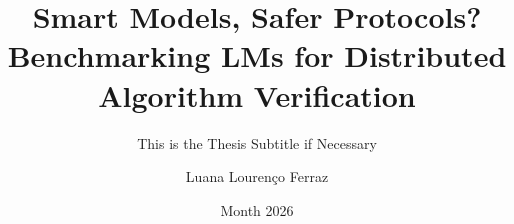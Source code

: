 %
%
\title{Smart Models, Safer Protocols? Benchmarking LMs for Distributed Algorithm Verification}
\subtitle{This is the Thesis Subtitle if Necessary}
%
\author{Luana Lourenço Ferraz}
%
%


%
%
\date{Month 2026}
%

